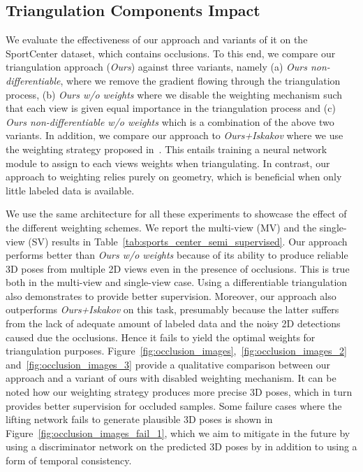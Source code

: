 \documentclass[runningheads]{llncs}
\begin{document}
\subsection*{Triangulation Components Impact}
\label{sec:triangle_component}
We evaluate the effectiveness of our approach and variants of it on the SportCenter dataset, which contains occlusions. To this end, we compare our triangulation approach ({\it Ours}) against three variants, namely (a) {\it Ours non-differentiable}, where we remove the gradient flowing through the triangulation process, (b) {\it Ours w/o weights} where we disable the weighting mechanism such that each view is given equal importance in the triangulation process and (c) {\it Ours non-differentiable w/o weights} which is a combination of the above two variants. In addition, we compare our approach to {\it Ours+Iskakov} where we use the weighting strategy proposed in~\cite{Iskakov19}. This entails training a neural network module to assign to each views weights when triangulating. In contrast, our approach to weighting relies purely on geometry, which is beneficial when only little labeled data is available. 

We use the same architecture for all these experiments to showcase the effect of the different weighting schemes. We report the multi-view (MV) and the single-view (SV) results in Table~\ref{tab:sports_center_semi_supervised}. Our approach performs better than {\it Ours w/o weights} because of its ability to produce reliable 3D poses from multiple 2D views even in the presence of occlusions. This is true both in the multi-view and single-view case. Using a differentiable triangulation also demonstrates to provide better supervision. Moreover, our approach also outperforms {\it Ours+Iskakov} on this task, presumably because the latter suffers from the lack of adequate amount of labeled data and the noisy 2D detections caused due the occlusions. Hence it fails to yield the optimal weights for triangulation purposes. Figure~\ref{fig:occlusion_images},~\ref{fig:occlusion_images_2} and~\ref{fig:occlusion_images_3} provide a qualitative comparison between our approach and a variant of ours with disabled weighting mechanism. It can be noted how our weighting strategy produces more precise 3D poses, which in turn provides better supervision for occluded samples. Some failure cases where the lifting network  fails to generate plausible 3D poses is shown in Figure~\ref{fig:occlusion_images_fail_1}, which we aim to mitigate in the future by using a discriminator network on the predicted 3D poses by  in addition to using a form of temporal consistency.
\end{document}
